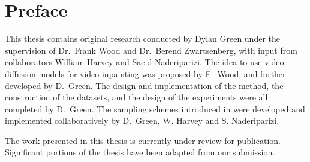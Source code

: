 
\chapter{Preface}
This thesis contains original research conducted by Dylan Green under the supervision of Dr.\ Frank Wood and Dr.\ Berend Zwartsenberg, with input from collaborators William Harvey and Saeid Naderiparizi. The idea to use video diffusion models for video inpainting was proposed by F.\ Wood, and further developed by D.\ Green. The design and implementation of the method, the construction of the datasets, and the design of the experiments were all completed by D.\ Green. The sampling schemes introduced in  were developed and implemented collaboratively by D.\ Green, W. Harvey and S. Naderiparizi. 

The work presented in this thesis is currently under review for publication. Significant portions of the thesis have been adapted from our submission. 
